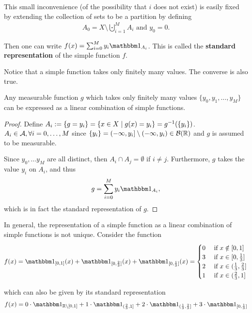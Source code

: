 This small inconvenience (of the possibility that $i$ does not exist) is easily fixed by extending the collection of sets to be a partition by defining
\begin{align*}
	A_0 = X \setminus \bigcupdot_{i = 1}^M A_i \text{ and } y_0 = 0.
\end{align*}

Then one can write $f(x) = \sum_{i = 0}^M y_i \ind_{A_i}$. This is called the \textbf{standard representation} of the simple function $f$.

Notice that a simple function takes only finitely many values. The converse is also true.

\begin{lem}
	Any measurable function $g$ which takes only finitely many values $\{y_0, y_1, \dots, y_M\}$ can be expressed as a linear combination of simple functions.
\end{lem}

\begin{proof}
	Define $A_i := \{g = y_i\} = \{x \in X \mid g(x) = y_i\} = {g}^{-1}(\{y_i\})$. $A_i \in \mathcal{A}, \forall i = 0, \dots, M$ since $\{y_i\} = (-\infty, y_i] \setminus (-\infty, y_i) \in \mathcal{B}(\mathbb{R})$ and $g$ is assumed to be measurable.
	
	Since $y_0, \dots y_M$ are all distinct, then $A_i \cap A_j = \emptyset$ if $i \neq j$. Furthermore, $g$ takes the value $y_i$ on $A_i$, and thus
	\begin{align*}
		g = \sum_{i = 0}^M y_i \ind_{A_i},
	\end{align*}
	which is in fact the standard representation of $g$.
\end{proof}

In general, the representation of a simple function as a linear combination of simple functions is not unique. Consider the function
\begin{align*}
	f(x) = \ind_{[0, 1]}(x) + \ind_{[0, \frac{2}{3}]}(x) + \ind_{[0, \frac{1}{3}]}(x) = \begin{cases}
	0 \tif x \notin [0, 1] \\
	3 \tif x \in [0, \frac{1}{3}] \\
	2 \tif x \in (\frac{1}{3}, \frac{2}{3}] \\
	1 \tif x \in (\frac{2}{3}, 1]
	\end{cases}
\end{align*}

which can also be given by its standard representation
\begin{align*}
	f(x) = 0 \cdot \ind_{\R\setminus [0, 1]} + 1 \cdot \ind_{(\frac{2}{3}, 1]} + 2 \cdot \ind_{(\frac{1}{3}, \frac{2}{3}]} + 3\cdot\ind_{[0, \frac{1}{3}]}
\end{align*}

